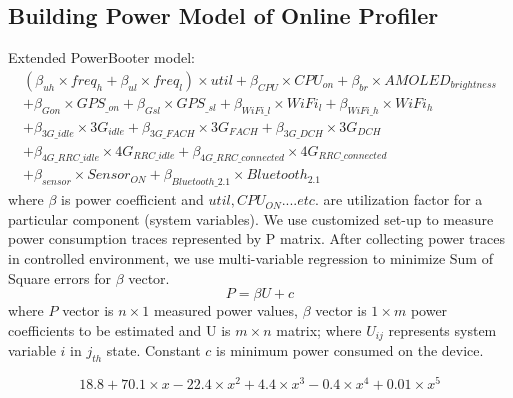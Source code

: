 \documentclass[a0,portrait]{a0poster}
\begin{document}
\begin{multicols}{2}
\subsection*{Building Power Model of Online Profiler}
\color{DarkSlateGray}
Extended PowerBooter model:
\begin{multline}
(\beta_{uh} \times freq_h + \beta_{ul} \times freq_l) \times util + \beta_{CPU} \times CPU_{on}
+ \beta_{br} \times AMOLED_{brightness} \\ 
+ \beta_{Gon} \times GPS_{\_on} + \beta_{Gsl} \times GPS_{\_sl}
+ \beta_{WiFi\_l} \times WiFi_l + \beta_{WiFi\_h} \times WiFi_h\\ 
+ \beta_{3G\_idle} \times 3G_{idle} 
+ \beta_{3G\_FACH} \times 3G_{FACH}
+ \beta_{3G\_DCH} \times 3G_{DCH} \\
+ \beta_{4G\_RRC\_idle} \times 4G_{RRC\_idle}
+ \beta_{4G\_RRC\_connected} \times 4G_{RRC\_connected} \\
+ \beta_{sensor} \times Sensor_{ON}
+ \beta_{Bluetooth\_2.1} \times Bluetooth_{2.1}
\label{eqn:Proposed Power Model for Samsung Galaxy S4}
\end{multline}
where $\beta$ is  power coefficient and $util, CPU_{ON}....  etc.$ are utilization factor for a particular component (system variables). We use customized set-up to measure power consumption traces represented by P matrix. After collecting power traces in controlled environment, we use multi-variable regression to minimize Sum of Square errors for $\beta$ vector.\\
\begin{equation}
P= \beta U+c
\end{equation}
where $P$ vector is $n \times 1$ measured power values, $\beta$ vector is $1 \times m$ power coefficients to be estimated and U is  $m \times n$ matrix; where $U_{ij}$ represents system variable $ i$ in $j_{th}$ state. Constant $c$ is minimum power consumed on the device.

\begin{equation}
18.8 + 70.1 \times x - 22.4 \times x^2 +  4.4 \times x^3 - 0.4 \times x^4 + 0.01 \times x^5
\end{equation}

\begin{equation}


\end{equation}
\end{multicols}
\end{document}
